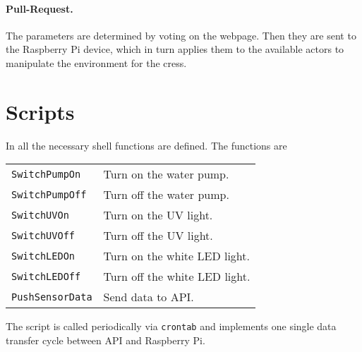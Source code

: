 \documentclass[twocolumn,a4wide,parskip,10pt]{scrartcl}
\begin{document}
\paragraph{Pull-Request.}

The parameters are determined by voting on the webpage. Then they
are sent to the Raspberry Pi device, which in turn applies them to the
available actors to manipulate the environment for the cress.

\appendix

\section{Scripts}

In  all the necessary shell functions are
defined. The functions are

\begin{tabular}{ll}
  \texttt{SwitchPumpOn} & Turn on the water pump.\\
  \texttt{SwitchPumpOff} & Turn off the water pump.\\
  \texttt{SwitchUVOn} & Turn on the UV light.\\
  \texttt{SwitchUVOff} & Turn off the UV light.\\
  \texttt{SwitchLEDOn} & Turn on the white LED light.\\
  \texttt{SwitchLEDOff} & Turn off the white LED light.\\
  \texttt{PushSensorData} & Send data to API.
\end{tabular}

The script  is called periodically via
\texttt{crontab} and implements one single data transfer cycle between
API and Raspberry Pi.
\end{document}
